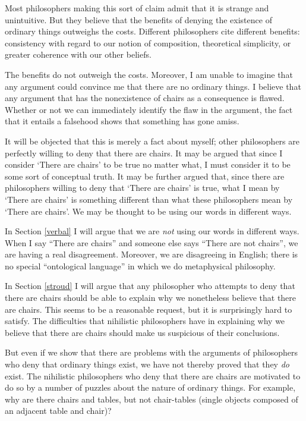 \documentclass[11pt]{article}
\begin{document}
\begin{spacing}{1.5}
Most philosophers making this sort of claim admit that it is strange
and unintuitive.  But they believe that the benefits of denying the
existence of ordinary things outweighs the costs.  Different
philosophers cite different benefits: consistency with regard to our
notion of composition, theoretical simplicity, or greater coherence
with our other beliefs.

The benefits do not outweigh the costs.  Moreover, I am unable to
imagine that any argument could convince me that there are no ordinary
things.  I believe that any argument that has the nonexistence of
chairs as a consequence is flawed.  Whether or not we can immediately
identify the flaw in the argument, the fact that it entails a
falsehood shows that something has gone amiss.

It will be objected that this is merely a fact about myself; other
philosophers are perfectly willing to deny that there are chairs.  It
may be argued that since I consider `There are chairs' to be true no
matter what, I must consider it to be some sort of conceptual truth.
It may be further argued that, since there are philosophers willing to
deny that `There are chairs' is true, what I mean by `There are
chairs' is something different than what these philosophers mean by
`There are chairs'.  We may be thought to be using our words in
different ways.

In Section \ref{verbal} I will argue that we are {\em not} using our
words in different ways.  When I say ``There are chairs'' and someone
else says ``There are not chairs'', we are having a real disagreement.
Moreover, we are disagreeing in English; there is no special
``ontological language'' in which we do metaphysical philosophy.

In Section \ref{stroud} I will argue that any philosopher who attempts
to deny that there are chairs should be able to explain why we
nonetheless believe that there are chairs.  This seems to be a
reasonable request, but it is surprisingly hard to satisfy.  The
difficulties that nihilistic philosophers have in explaining why we
believe that there are chairs should make us suspicious of their
conclusions.

But even if we show that there are problems with the arguments of
philosophers who deny that ordinary things exist, we have not thereby
proved that they {\em do} exist.  The nihilistic philosophers who deny
that there are chairs are motivated to do so by a number of puzzles
about the nature of ordinary things.  For example, why are there
chairs and tables, but not chair-tables (single objects composed of an
adjacent table and chair)?


\end{spacing}
\end{document}
